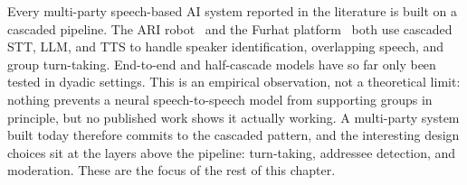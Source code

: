 
Every multi-party speech-based AI system reported in the literature is
built on a cascaded pipeline. The ARI robot~\cite{addlesee2024ari} and
the Furhat platform~\cite{axelsson2025furhat} both use cascaded STT, LLM,
and TTS to handle speaker identification, overlapping speech, and group
turn-taking. End-to-end and half-cascade models have so far only been
tested in dyadic settings. This is an empirical observation, not a
theoretical limit: nothing prevents a neural speech-to-speech model from
supporting groups in principle, but no published work shows it actually
working. A multi-party system built today therefore commits to the
cascaded pattern, and the interesting design choices sit at the layers
above the pipeline: turn-taking, addressee detection, and moderation.
These are the focus of the rest of this chapter.
